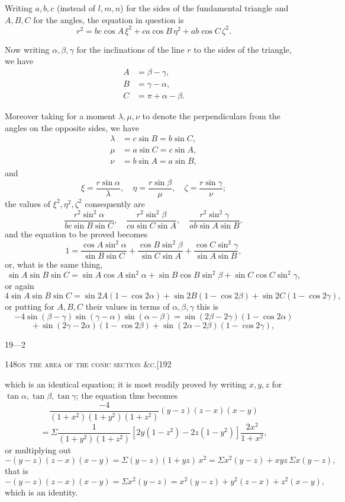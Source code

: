 \documentclass[11pt]{article}
\begin{document}
\medskip

Writing $a, b, c$ (instead of $l, m, n$) for the sides of the fundamental triangle and $A, B, C$ for the angles, the equation in question is
\[
r^{2} = bc\cos A\, \xi^{2} + ca\cos B\, \eta^{2} + ab\cos C\, \zeta^{2}.
\]

Now writing $\alpha, \beta, \gamma$ for the inclinations of the line $r$ to the sides of the triangle, we have
\begin{align*}
A &= \beta - \gamma,\\
B &= \gamma - \alpha,\\
C &= \pi + \alpha - \beta.
\end{align*}

Moreover taking for a moment $\lambda, \mu, \nu$ to denote the perpendiculars from the angles on the opposite sides, we have
\begin{align*}
\lambda &= c\sin B = b\sin C,\\
\mu &= a\sin C = c\sin A,\\
\nu &= b\sin A = a\sin B,
\end{align*}
and
\[
\xi = \frac{r\sin\alpha}{\lambda},\quad \eta = \frac{r\sin\beta}{\mu},\quad \zeta = \frac{r\sin\gamma}{\nu};
\]
the values of $\xi^{2}, \eta^{2}, \zeta^{2}$ consequently are
\[
\frac{r^{2}\sin^{2}\alpha}{bc\sin B\sin C},\quad \frac{r^{2}\sin^{2}\beta}{ca\sin C\sin A},\quad \frac{r^{2}\sin^{2}\gamma}{ab\sin A\sin B},
\]
and the equation to be proved becomes
\[
1 = \frac{\cos A\sin^{2}\alpha}{\sin B\sin C} + \frac{\cos B\sin^{2}\beta}{\sin C\sin A} + \frac{\cos C\sin^{2}\gamma}{\sin A\sin B},
\]
or, what is the same thing,
\[
\sin A\sin B\sin C = \sin A\cos A\sin^{2}\alpha + \sin B\cos B\sin^{2}\beta + \sin C\cos C\sin^{2}\gamma,
\]
or again
\[
4\sin A\sin B\sin C = \sin 2A(1 - \cos 2\alpha) + \sin 2B(1 - \cos 2\beta) + \sin 2C(1 - \cos 2\gamma),
\]
or putting for $A, B, C$ their values in terms of $\alpha, \beta, \gamma$ this is
\[
-4\sin(\beta - \gamma)\sin(\gamma - \alpha)\sin(\alpha - \beta) = \sin(2\beta - 2\gamma)(1 - \cos 2\alpha)
\]
\[
+\, \sin(2\gamma - 2\alpha)(1 - \cos 2\beta) + \sin(2\alpha - 2\beta)(1 - \cos 2\gamma),
\]

\hfill 19---2

\bigskip

\begin{center}\small 148\hfill\textsc{on the area of the conic section \&c.}\hfill [192\end{center}

\medskip

\noindent which is an identical equation; it is most readily proved by writing $x, y, z$ for $\tan\alpha, \tan\beta, \tan\gamma$; the equation thus becomes
\[
\frac{-4}{(1 + x^{2})(1 + y^{2})(1 + z^{2})}(y - z)(z - x)(x - y)
\]
\[
= \Sigma \frac{1}{(1 + y^{2})(1 + z^{2})}\left[2y(1 - z^{2}) - 2z(1 - y^{2})\right]\frac{2x^{2}}{1 + x^{2}},
\]
or multiplying out
\[
-(y - z)(z - x)(x - y) = \Sigma(y - z)(1 + yz)\, x^{2} = \Sigma x^{2}(y - z) + xyz\, \Sigma x(y - z),
\]
that is
\[
-(y - z)(z - x)(x - y) = \Sigma x^{2}(y - z) = x^{2}(y - z) + y^{2}(z - x) + z^{2}(x - y),
\]
which is an identity.
\end{document}
